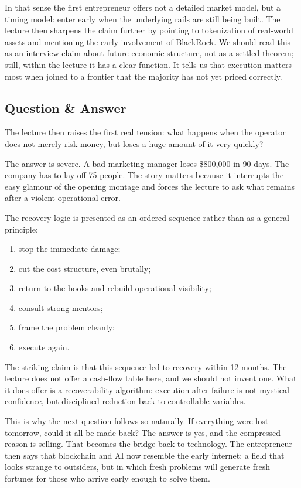 In that sense the first entrepreneur offers not a detailed market model, but a timing model: enter early when the underlying rails are still being built. The lecture then sharpens the claim further by pointing to tokenization of real-world assets and mentioning the early involvement of BlackRock. We should read this as an interview claim about future economic structure, not as a settled theorem; still, within the lecture it has a clear function. It tells us that execution matters most when joined to a frontier that the majority has not yet priced correctly.

\subsection{Question \& Answer}

The lecture then raises the first real tension: what happens when the operator does not merely risk money, but loses a huge amount of it very quickly?

The answer is severe. A bad marketing manager loses \$800{,}000 in 90 days. The company has to lay off 75 people. The story matters because it interrupts the easy glamour of the opening montage and forces the lecture to ask what remains after a violent operational error.

The recovery logic is presented as an ordered sequence rather than as a general principle:

\begin{enumerate}
\item stop the immediate damage;
\item cut the cost structure, even brutally;
\item return to the books and rebuild operational visibility;
\item consult strong mentors;
\item frame the problem cleanly;
\item execute again.
\end{enumerate}

The striking claim is that this sequence led to recovery within 12 months. The lecture does not offer a cash-flow table here, and we should not invent one. What it does offer is a recoverability algorithm: execution after failure is not mystical confidence, but disciplined reduction back to controllable variables.

This is why the next question follows so naturally. If everything were lost tomorrow, could it all be made back? The answer is yes, and the compressed reason is selling. That becomes the bridge back to technology. The entrepreneur then says that blockchain and AI now resemble the early internet: a field that looks strange to outsiders, but in which fresh problems will generate fresh fortunes for those who arrive early enough to solve them.

